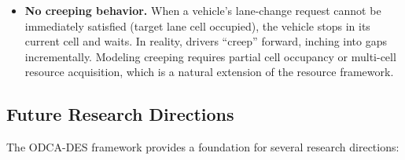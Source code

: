 \documentclass[review,authoryear]{elsarticle}
\begin{document}
\begin{itemize}
    \item \textbf{No creeping behavior.} When a vehicle's lane-change request cannot be immediately satisfied (target lane cell occupied), the vehicle stops in its current cell and waits. In reality, drivers ``creep'' forward, inching into gaps incrementally. Modeling creeping requires partial cell occupancy or multi-cell resource acquisition, which is a natural extension of the resource framework.
\end{itemize}

\subsection{Future Research Directions}

The ODCA-DES framework provides a foundation for several research directions:
\end{document}
